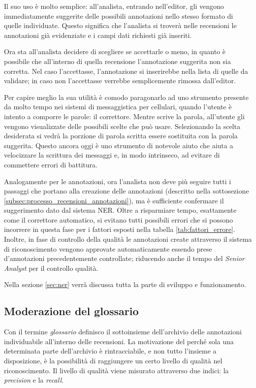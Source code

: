 Il suo uso è molto semplice: all'analista, entrando nell'editor, gli vengono
immediatamente suggerite delle possibili annotazioni nello stesso formato di
quelle individuate. Questo significa che l'analista si troverà nelle recensioni
le annotazioni già evidenziate e i campi dati richiesti già inseriti.

Ora sta all'analista decidere di scegliere se accettarle o meno, in quanto è
possibile che all'interno di quella recensione l'annotazione suggerita non sia
corretta. Nel caso l'accettasse, l'annotazione si inserirebbe nella lista di
quelle da validare; in caso non l'accettasse verrebbe semplicemente rimossa
dall'editor.

Per capire meglio la sua utilità è comodo paragonarlo ad uno strumento presente
da molto tempo nei sistemi di messaggistica per cellulari, quando l'utente è
intento a comporre le parole: il correttore. Mentre scrive la parola,
all'utente gli vengono visualizzate delle possibili scelte che può usare.
Selezionando la scelta desiderata si vedrà la porzione di parola scritta essere
sostituita con la parola suggerita. Questo ancora oggi è uno strumento di
notevole aiuto che aiuta a velocizzare la scrittura dei messaggi e, in modo
intrinseco, ad evitare di commettere errori di battitura.

Analogamente per le annotazioni, ora l'analista non deve più seguire tutti i
passaggi che portano alla creazione delle annotazioni (descritto nella
sottosezione \ref{subsec:processo_recensioni_annotazioni}), ma è sufficiente
confermare il suggerimento dato dal sistema \gls{NER}. Oltre a risparmiare
tempo, esattamente come il correttore automatico, si evitano tutti possibili
errori che si possono incorrere in questa fase per i fattori esposti nella
tabella \ref{tab:fattori_errore}. Inoltre, in fase di controllo della qualità le
annotazioni create attraverso il sistema di riconoscimento vengono approvate
automaticamente essendo prese d'annotazioni precedentemente controllate;
riducendo anche il tempo del \textit{Senior Analyst} per il controllo qualità.

Nella sezione \ref{sec:ner} verrà discussa tutta la parte di sviluppo e
funzionamento.

\subsection{Moderazione del glossario}
Con il termine \textit{glossario} definisco il sottoinsieme dell'archivio
delle annotazioni individuabile all'interno delle recensioni. La motivazione del
perché sola una determinata parte dell'archivio è rintracciabile, e non tutto
l'insieme a disposizione, è la possibilità di raggiungere un certo livello di
qualità nel riconoscimento. Il livello di qualità viene misurato attraverso due
indici: la \textit{precision} e la \textit{recall}.

